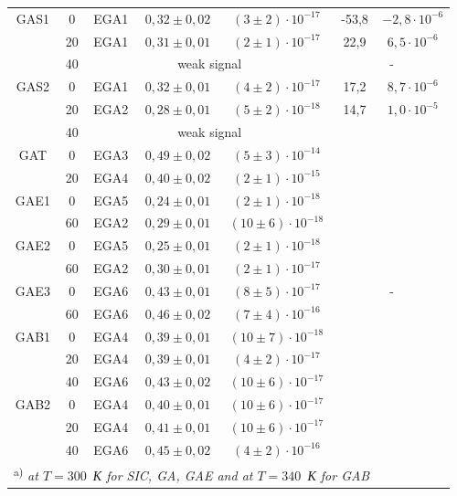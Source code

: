 \documentclass[final,3p,times,twocolumn,authoryear]{elsarticle}
\begin{document}
\begin{table}
\begin{tabular}{ccccccc}
GAS1& 0 &EGA1& $0,32\pm0,02$ &$(3\pm2)\cdot10^{-17}$&-53,8&$-2,8\cdot10^{-6}$\\ %
& 20 &EGA1& $0,31\pm0,01$ &$(2\pm1)\cdot10^{-17}$&22,9&$6,5\cdot10^{-6}$\\ %
& 40 & \multicolumn{3}{c}{weak signal}&\multicolumn{2}{c}{-}\\ %
GAS2& 0 &EGA1& $0,32\pm0,01$ &$(4\pm2)\cdot10^{-17}$&17,2&$8,7\cdot10^{-6}$\\ %
& 20 &EGA2& $0,28\pm0,01$ &$(5\pm2)\cdot10^{-18}$&14,7&$1,0\cdot10^{-5}$\\ %
& 40 & \multicolumn{3}{c}{weak signal}&\multicolumn{2}{c}{}\\ %
GAT& 0 &EGA3& $0,49\pm0,02$ &$(5\pm3)\cdot10^{-14}$&\multicolumn{2}{c}{}\\ %
& 20 &EGA4& $0,40\pm0,02$ &$(2\pm1)\cdot10^{-15}$&\multicolumn{2}{c}{}\\ %
GAE1& 0 &EGA5& $0,24\pm0,01$ &$(2\pm1)\cdot10^{-18}$&\multicolumn{2}{c}{}\\ %
& 60 &EGA2& $0,29\pm0,01$ &$(10\pm6)\cdot10^{-18}$&\multicolumn{2}{c}{}\\ %
GAE2& 0 &EGA5& $0,25\pm0,01$ &$(2\pm1)\cdot10^{-18}$&\multicolumn{2}{c}{}\\ %
& 60 &EGA2& $0,30\pm0,01$ &$(2\pm1)\cdot10^{-17}$&\multicolumn{2}{c}{}\\ %
GAE3& 0 &EGA6& $0,43\pm0,01$ &$(8\pm5)\cdot10^{-17}$&\multicolumn{2}{c}{-}\\ %
& 60 &EGA6& $0,46\pm0,02$ &$(7\pm4)\cdot10^{-16}$&\multicolumn{2}{c}{}\\ %
GAB1& 0 &EGA4& $0,39\pm0,01$ &$(10\pm7)\cdot10^{-18}$&\multicolumn{2}{c}{}\\ %
& 20 &EGA4& $0,39\pm0,01$ &$(4\pm2)\cdot10^{-17}$&\multicolumn{2}{c}{}\\ %
& 40 &EGA6& $0,43\pm0,02$ &$(10\pm6)\cdot10^{-17}$&\multicolumn{2}{c}{}\\ %
GAB2& 0 &EGA4& $0,40\pm0,01$ &$(10\pm6)\cdot10^{-17}$&\multicolumn{2}{c}{}\\ %
& 20 &EGA4& $0,41\pm0,01$ &$(10\pm6)\cdot10^{-17}$&\multicolumn{2}{c}{}\\ %
& 40 &EGA6& $0,45\pm0,02$ &$(4\pm2)\cdot10^{-16}$&\multicolumn{2}{c}{}\\  %
\multicolumn{6}{l}{\textsuperscript{ a)} \emph{at $T=300$~К for SIC, GA, GAE and at $T=340$~К for GAB}}\\
\hline
\end{tabular}
\end{table}
\end{document}
